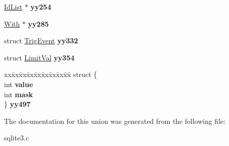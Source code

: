 \begin{DoxyCompactItemize}
\item 
\hyperlink{structIdList}{Id\+List} $\ast$ {\bfseries yy254}\hypertarget{unionYYMINORTYPE_a2c5a8617af8d21140ef030b3432fc88a}{}\label{unionYYMINORTYPE_a2c5a8617af8d21140ef030b3432fc88a}

\item 
\hyperlink{structWith}{With} $\ast$ {\bfseries yy285}\hypertarget{unionYYMINORTYPE_a352681ca0ddf1e1eb6208f2277bbe70f}{}\label{unionYYMINORTYPE_a352681ca0ddf1e1eb6208f2277bbe70f}

\item 
struct \hyperlink{structTrigEvent}{Trig\+Event} {\bfseries yy332}\hypertarget{unionYYMINORTYPE_aed59879c2d3501a15586de9eba852459}{}\label{unionYYMINORTYPE_aed59879c2d3501a15586de9eba852459}

\item 
struct \hyperlink{structLimitVal}{Limit\+Val} {\bfseries yy354}\hypertarget{unionYYMINORTYPE_a8dc6d33ba3ddcb6b3abb56481ec623f3}{}\label{unionYYMINORTYPE_a8dc6d33ba3ddcb6b3abb56481ec623f3}

\item 
\begin{tabbing}
xx\=xx\=xx\=xx\=xx\=xx\=xx\=xx\=xx\=\kill
struct \{\\
\>int {\bfseries value}\\
\>int {\bfseries mask}\\
\} {\bfseries yy497}\hypertarget{unionYYMINORTYPE_a4a258ed78846162da1f87131a866a9bf}{}\label{unionYYMINORTYPE_a4a258ed78846162da1f87131a866a9bf}
\\

\end{tabbing}\end{DoxyCompactItemize}


The documentation for this union was generated from the following file\+:\begin{DoxyCompactItemize}
\item 
sqlite3.\+c\end{DoxyCompactItemize}
